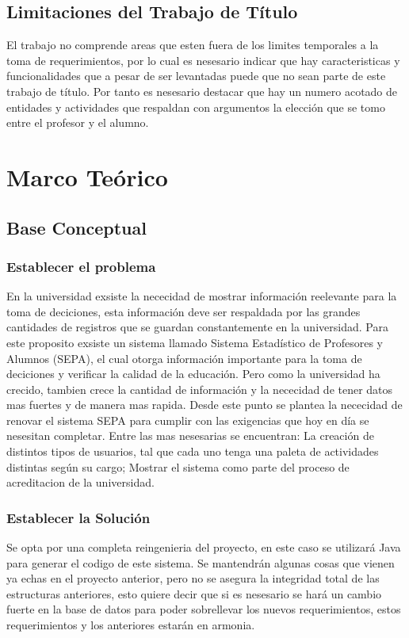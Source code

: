 \documentclass[a4paper,12pt,openany,oneside]{book}
\begin{document}
\section{Limitaciones del Trabajo de Título}
El trabajo no comprende areas que esten fuera de los limites temporales a la toma de requerimientos, por lo cual es nesesario indicar que hay caracteristicas y funcionalidades que a pesar de ser levantadas puede que no sean parte de este trabajo de título. Por tanto es nesesario destacar que hay un numero acotado de entidades y actividades que respaldan con argumentos la elección que se tomo entre el profesor y el alumno.
\chapter{Marco Teórico}
\thispagestyle{empty}
\section{Base Conceptual}
\subsection{Establecer el problema}
En la universidad exsiste la nececidad de mostrar información reelevante para la toma de deciciones, esta información deve ser respaldada por las grandes cantidades de registros que se guardan constantemente en la universidad. Para este proposito exsiste un sistema llamado Sistema Estadístico de Profesores y Alumnos (SEPA), el cual otorga información importante para la toma de deciciones y verificar la calidad de la educación. Pero como la universidad ha crecido, tambien crece la cantidad de información y la nececidad de tener datos mas fuertes y de manera mas rapida. Desde este punto se plantea la nececidad de renovar el sistema SEPA para cumplir con las exigencias que hoy en día se nesesitan completar. Entre las mas nesesarias se encuentran: La creación de distintos tipos de usuarios, tal que cada uno tenga una paleta de actividades distintas según su cargo; Mostrar el sistema como parte del proceso de acreditacion de la universidad.
\subsection{Establecer la Solución}
Se opta por una completa reingenieria del proyecto, en este caso se utilizará Java para generar el codigo de este sistema. Se mantendrán algunas cosas que vienen ya echas en el proyecto anterior, pero no se asegura la integridad total de las estructuras anteriores, esto quiere decir que si es nesesario se hará un cambio fuerte en la base de datos para poder sobrellevar los nuevos requerimientos, estos requerimientos y los anteriores estarán en armonia.
\end{document}

